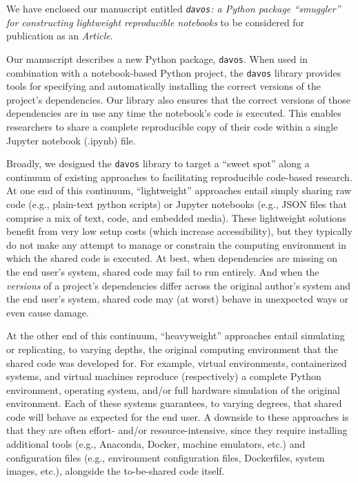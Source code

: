 \documentclass[11pt,stdletter,orderfromtodate,sigleft]{newlfm}
\begin{document}
\begin{newlfm}

  We have enclosed our manuscript entitled \textit{\texttt{davos}: a
    Python package ``smuggler'' for constructing lightweight
    reproducible notebooks} to be considered for publication as
  an \textit{Article}.

  Our manuscript describes a new Python package, \texttt{davos}.  When
  used in combination with a notebook-based Python project, the
  \texttt{davos} library provides tools for specifying and
  automatically installing the correct versions of the project's
  dependencies.  Our library also ensures that the correct versions of
  those dependencies are in use any time the notebook's code is
  executed.  This enables researchers to share a complete reproducible
  copy of their code within a single Jupyter notebook (.ipynb) file.

  Broadly, we designed the \texttt{davos} library to target a ``sweet
  spot'' along a continuum of existing approaches to facilitating reproducible
  code-based research.  At one end of this continuum, ``lightweight''
  approaches entail simply sharing raw code (e.g., plain-text python
  scripts) or Jupyter notebooks (e.g., JSON files that comprise a mix
  of text, code, and embedded media).  These lightweight solutions
  benefit from very low setup costs (which increase accessibility),
  but they typically do not make any attempt to manage or constrain
  the computing environment in which the shared code is executed.
  At best, when dependencies are missing on the end user's system, shared code
 may fail to run entirely.  And when the \textit{versions} of a
 project's dependencies differ across the original author's system and
 the end user's system, shared code may (at worst) behave in
 unexpected ways or even cause damage.

 At the other end of this continuum, ``heavyweight'' approaches entail
 simulating or replicating, to varying depths, the original computing
 environment that the shared code was developed for.  For example,
 virtual environments, containerized systems, and virtual machines
 reproduce (respectively) a complete Python environment, operating system, and/or
 full hardware simulation of the original environment.  Each of these
 systems guarantees, to varying degrees, that shared code will behave
 as expected for the end user.  A downside to these approaches is that
 they are often effort- and/or resource-intensive, since they require
 installing additional tools (e.g., Anaconda, Docker, machine
 emulators, etc.) and
 configuration files (e.g., environment configuration files,
 Dockerfiles, system images, etc.), alongside the to-be-shared code
 itself.


\end{newlfm}
\end{document}
